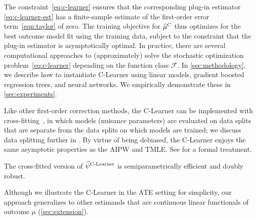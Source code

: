 The constraint~\eqref{eq:c-learner}
 ensures that the corresponding plug-in estimator \eqref{eq:c-learner-est} has a finite-sample estimate of the first-order error term~\eqref{eqn:taylor} of zero. 
 The training objective for $\widehat{\mu}^C$ thus optimizes for the best outcome model fit using the training data, subject to the constraint that the plug-in estimator is asymptotically optimal. In practice, there 
are several computational approaches to (approximately) solve the  stochastic optimization problem~\eqref{eq:c-learner}
depending on the function class $\mathcal F$. 
In \cref{sec:methodology}, we describe how to instantiate C-Learner using linear models, gradient boosted regression trees, and neural networks. We empirically demonstrate these in \cref{sec:experiments}.

Like other first-order correction methods, the C-Learner can be implemented with cross-fitting~\cite{ChernozhukovChDeDuHaNeRo18}, in which models (nuisance parameters) are evaluated on data splits that are separate from the data splits on which models are trained; we discuss data splitting further in . By virtue of being debiased, the C-Learner enjoys
the same asymptotic properties as the AIPW and TMLE. See  for a formal treatment. 
\begin{theorem}[Informal]
The cross-fitted version of
$\widehat{\psi}^{\textrm {C-Learner}}$ is semiparametrically efficient and doubly robust. 
\end{theorem}
\noindent Although we illustrate the C-Learner in the ATE setting for simplicity, %
our approach generalizes to other estimands that are 
continuous linear functionals of outcome $\mu$ (\cref{sec:extension}).


